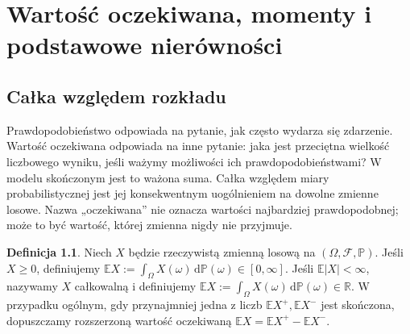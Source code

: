 \documentclass[11pt,a4paper,oneside]{report}
\numberwithin{equation}{chapter}
\theoremstyle{plain}
\theoremstyle{definition}
\newtheorem{definicja}{Definicja}[chapter]
\theoremstyle{remark}
\newcommand{\R}{\mathbb{R}}
\newcommand{\Prob}{\mathbb{P}}
\newcommand{\E}{\mathbb{E}}
\newcommand{\dd}{\mathrm{d}}
\begin{document}
\chapter{Wartość oczekiwana, momenty i podstawowe nierówności}

\section{Całka względem rozkładu}
Prawdopodobieństwo odpowiada na pytanie, jak często wydarza się
zdarzenie. Wartość oczekiwana odpowiada na inne pytanie:
jaka jest przeciętna wielkość liczbowego wyniku, jeśli ważymy
możliwości ich prawdopodobieństwami? W modelu skończonym jest
to ważona suma. Całka względem miary probabilistycznej jest
jej konsekwentnym uogólnieniem na dowolne zmienne losowe.
Nazwa „oczekiwana” nie oznacza wartości najbardziej prawdopodobnej;
może to być wartość, której zmienna nigdy nie przyjmuje.

\begin{definicja}
Niech $X$ będzie rzeczywistą zmienną losową na
$(\Omega,\mathcal F,\Prob)$. Jeśli $X\geq0$, definiujemy
$\E X:=\int_\Omega X(\omega)\,\dd\Prob(\omega)\in[0,\infty]$.
Jeśli $\E|X|<\infty$, nazywamy $X$ całkowalną i definiujemy
$\E X:=\int_\Omega X(\omega)\,\dd\Prob(\omega)\in\R$.
W przypadku ogólnym, gdy przynajmniej jedna z liczb
$\E X^+,\E X^-$ jest skończona, dopuszczamy rozszerzoną
wartość oczekiwaną $\E X=\E X^+-\E X^-$.
\end{definicja}
\end{document}
